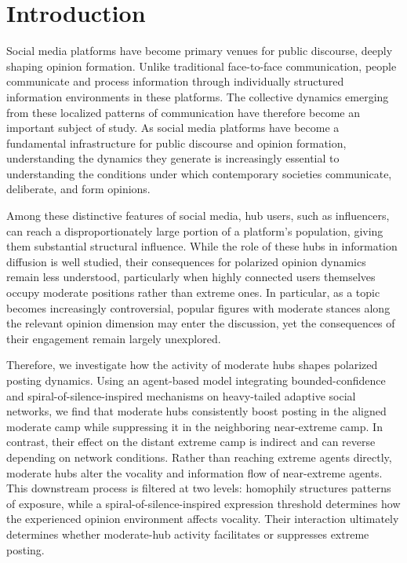 \documentclass{svproc}
\def\Blue{\color[rgb]{0,0,1}}
\def\Black{\color[rgb]{0,0,0}}
\begin{document}
\begin{abstract}
\Black
{} 
\end{abstract}

\Blue


\section{Introduction}\label{sec:intro}

Social media platforms have become primary venues for public
discourse, deeply shaping opinion formation. Unlike traditional
face-to-face communication, people communicate and process information
through individually structured information environments in these platforms. 
The collective dynamics emerging from these localized patterns 
of communication have therefore become an important subject of 
study. As social media platforms have become a fundamental 
infrastructure for public discourse and opinion formation, 
understanding the dynamics they generate is increasingly 
essential to understanding the conditions under which 
contemporary societies communicate, deliberate, and 
form opinions.

Among these distinctive features of social media, hub users, such as
influencers, can reach a disproportionately large portion of a
platform's population, giving them substantial structural influence.
While the role of these hubs in information diffusion is well studied,
their consequences for polarized opinion dynamics remain less
understood, particularly when highly connected users themselves occupy
moderate positions rather than extreme ones. In particular, as a topic
becomes increasingly controversial, popular figures with moderate
stances along the relevant opinion dimension may enter the discussion,
yet the consequences of their engagement remain largely unexplored.

\par

Therefore, we investigate how the activity of moderate hubs shapes
polarized posting dynamics. Using an agent-based model integrating
bounded-confidence and spiral-of-silence-inspired mechanisms on
heavy-tailed adaptive social networks, we find that moderate hubs
consistently boost posting in the aligned moderate camp while
suppressing it in the neighboring near-extreme camp. In contrast,
their effect on the distant extreme camp is indirect and can reverse
depending on network conditions. Rather than reaching extreme agents
directly, moderate hubs alter the vocality and information flow of
near-extreme agents. This downstream process is filtered at two levels:
homophily structures patterns of exposure, while a
spiral-of-silence-inspired expression threshold determines how the
experienced opinion environment affects vocality. Their interaction
ultimately determines whether moderate-hub activity facilitates or
suppresses extreme posting.
\end{document}
